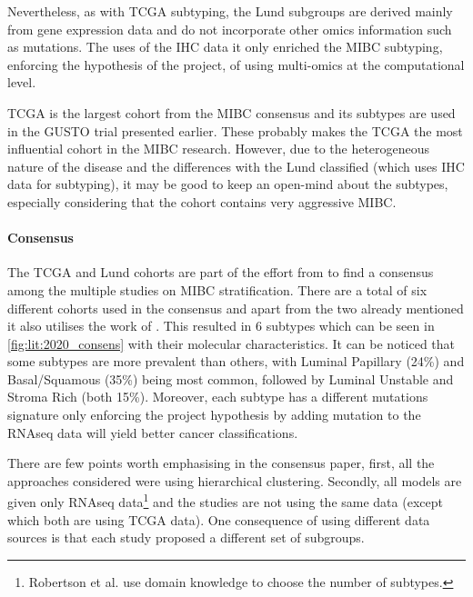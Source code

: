 Nevertheless, as with TCGA subtyping, the Lund subgroups are derived mainly from gene expression data and do not incorporate other omics information such as mutations. The uses of the IHC data it only enriched the MIBC subtyping, enforcing the hypothesis of the project, of using multi-omics at the computational level.

TCGA is the largest cohort from the MIBC consensus and its subtypes are used in the GUSTO trial presented earlier. These probably makes the TCGA the most influential cohort in the MIBC research. However, due to the heterogeneous nature of the disease and the differences with the Lund classified (which uses IHC data for subtyping), it may be good to keep an open-mind about the subtypes, especially considering that the cohort contains very aggressive MIBC.

\paragraph*{Consensus} \label{s:lit:consensus_mibc}

The TCGA and Lund cohorts are part of the effort from \citet{Kamoun2020-tj} to find a consensus among the multiple studies on MIBC stratification. There are a total of six different cohorts used in the consensus and apart from the two already mentioned \citet{Kamoun2020-tj} it also utilises the work of \citet{Mo2018-rl, Damrauer2014-tc, Choi2014-ed, Rebouissou2014-ep}. This resulted in 6 subtypes which can be seen in \cref{fig:lit:2020_consens} with their molecular characteristics. It can be noticed that some subtypes are more prevalent than others, with Luminal Papillary (24\%) and Basal/Squamous (35\%) being most common, followed by Luminal Unstable and Stroma Rich (both 15\%). Moreover, each subtype has a different mutations signature only enforcing the project hypothesis by adding mutation to the RNAseq data will yield better cancer classifications.

There are few points worth emphasising in the consensus paper, first, all the approaches\cite{Mo2018-rl, Damrauer2014-tc, Choi2014-ed, Marzouka2018-ge, Rebouissou2014-ep,Robertson2017-mg} considered were using hierarchical clustering. Secondly, all models are given only RNAseq data\footnote{Robertson et al. use domain knowledge to choose the number of subtypes.} and the studies are not using the same data (except \cite{Robertson2017-mg, Mo2018-rl} which both are using TCGA data). One consequence of using different data sources is that each study proposed a different set of subgroups. 

